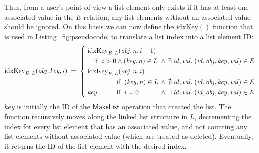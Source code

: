 Thus, from a user's point of view a list element only exists if it has at least one associated value in the $E$ relation; any list elements without an associated value should be ignored.
On this basis we can now define the $\mathrm{idxKey}()$ function that is used in Listing~\ref{fig:pseudocode} to translate a list index into a list element ID:
\[ \mathrm{idxKey}_{E,\, L}(\mathit{obj}, \mathit{key}, i) \;=\; \left\{
   \arraycolsep=2pt \def\arraystretch{1.3}
   \begin{array}{llllll}
       \mathrm{idxKey}_{E,\, L}(\mathit{obj}, n, i-1) \\
       \quad\text{if }\; i > 0 \wedge (\mathit{key}, n) \in L & \wedge &
       \exists\,\mathit{id}, \mathit{val}.\; (\mathit{id}, \mathit{obj}, \mathit{key}, \mathit{val}) \in E \\
       \mathrm{idxKey}_{E,\, L}(\mathit{obj}, n, i) \\
       \quad \hphantom{i > 0 \;\wedge\;} \text{if }\; (\mathit{key}, n) \in L & \wedge &
       \nexists\,\mathit{id}, \mathit{val}.\; (\mathit{id}, \mathit{obj}, \mathit{key}, \mathit{val}) \in E \\
       \mathit{key} \hspace{29.5pt}\text{if }\; i = 0 & \wedge &
       \exists\,\mathit{id}, \mathit{val}.\; (\mathit{id}, \mathit{obj}, \mathit{key}, \mathit{val}) \in E \\
   \end{array} \right. \]
$\mathit{key}$ is initially the ID of the $\mathsf{MakeList}$ operation that created the list.
The function recursively moves along the linked list structure in $L$, decrementing the index for every list element that has an associated value, and not counting any list elements without associated value (which are treated as deleted).
Eventually, it returns the ID of the list element with the desired index.
